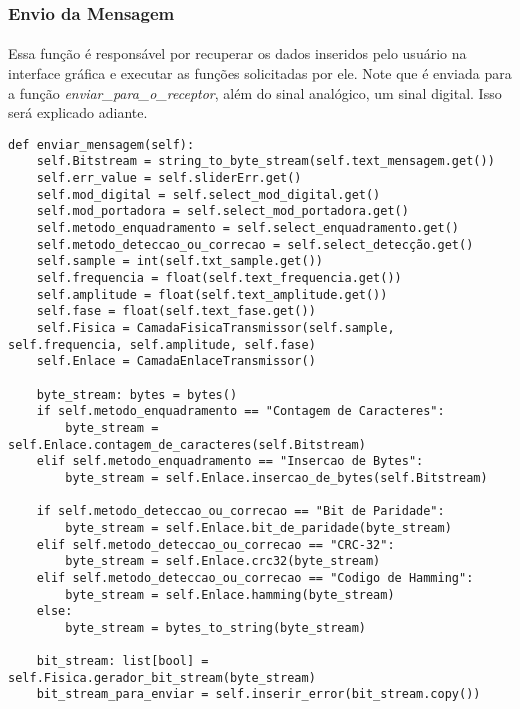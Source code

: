 \documentclass[12pt, a4paper]{article}
\newenvironment{code}{\captionsetup{type=listing}}{}
\begin{document}
\subsubsection{Envio da Mensagem}
\paragraph{}
Essa função é responsável por recuperar os dados inseridos pelo usuário na interface gráfica e executar as funções solicitadas por ele. Note que é enviada para a função \textit{enviar\_para\_o\_receptor}, além do sinal analógico, um sinal digital. Isso será explicado adiante.

\begin{code}
\begin{verbatim}
def enviar_mensagem(self):
    self.Bitstream = string_to_byte_stream(self.text_mensagem.get())
    self.err_value = self.sliderErr.get()
    self.mod_digital = self.select_mod_digital.get()
    self.mod_portadora = self.select_mod_portadora.get()
    self.metodo_enquadramento = self.select_enquadramento.get()
    self.metodo_deteccao_ou_correcao = self.select_detecção.get()
    self.sample = int(self.txt_sample.get())
    self.frequencia = float(self.text_frequencia.get())
    self.amplitude = float(self.text_amplitude.get())
    self.fase = float(self.text_fase.get())
    self.Fisica = CamadaFisicaTransmissor(self.sample, self.frequencia, self.amplitude, self.fase)
    self.Enlace = CamadaEnlaceTransmissor()
    
    byte_stream: bytes = bytes()
    if self.metodo_enquadramento == "Contagem de Caracteres":
        byte_stream = self.Enlace.contagem_de_caracteres(self.Bitstream)
    elif self.metodo_enquadramento == "Insercao de Bytes":
        byte_stream = self.Enlace.insercao_de_bytes(self.Bitstream)
    
    if self.metodo_deteccao_ou_correcao == "Bit de Paridade":
        byte_stream = self.Enlace.bit_de_paridade(byte_stream)
    elif self.metodo_deteccao_ou_correcao == "CRC-32":
        byte_stream = self.Enlace.crc32(byte_stream)
    elif self.metodo_deteccao_ou_correcao == "Codigo de Hamming":
        byte_stream = self.Enlace.hamming(byte_stream)
    else:
        byte_stream = bytes_to_string(byte_stream)
    
    bit_stream: list[bool] = self.Fisica.gerador_bit_stream(byte_stream)
    bit_stream_para_enviar = self.inserir_error(bit_stream.copy())
    

\end{verbatim}
\end{code}
\end{document}
